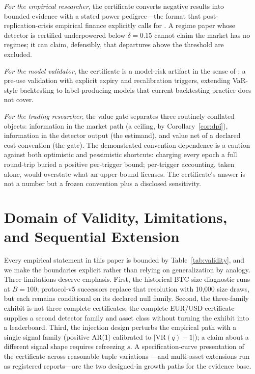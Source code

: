 \documentclass[3p]{elsarticle}
\newcommand{\VR}{\ensuremath{\mathrm{VR}}}
\begin{document}
\noindent\emph{For the empirical researcher}, the certificate converts negative
results into bounded evidence with a stated power pedigree---the format that
post-replication-crisis empirical finance explicitly calls for
\citep{Harvey2017,HouXueZhang2020}. A regime paper whose detector is
certified underpowered below $\delta=0.15$ cannot claim the market has no
regimes; it can claim, defensibly, that departures above the threshold are
excluded.

\par\medskip\noindent\emph{For the model validator}, the certificate is a model-risk artifact
in the sense of \citet{FederalReserveOCC2011}: a pre-use validation with
explicit expiry and recalibration triggers, extending VaR-style backtesting
\citep{Kupiec1995,Christoffersen1998} to label-producing models that current
backtesting practice does not cover.

\par\medskip\noindent\emph{For the trading researcher}, the value gate separates three
routinely conflated objects: information in the market path (a ceiling, by
Corollary~\ref{cor:dpi}), information in the detector output (the estimand),
and value net of a declared cost convention (the gate). The demonstrated
convention-dependence is a caution against both optimistic and pessimistic
shortcuts: charging every epoch a full round-trip buried a positive
per-trigger bound; per-trigger accounting, taken alone, would overstate what
an upper bound licenses. The certificate's answer is not a number but a
frozen convention plus a disclosed sensitivity.

\section{Domain of Validity, Limitations, and Sequential Extension}
\label{sec:validity}

Every empirical statement in this paper is bounded by
Table~\ref{tab:validity}, and we make the boundaries explicit rather than
relying on generalization by analogy. Three limitations deserve emphasis.
First, the historical BTC size diagnostic runs at $B=100$; protocol-v5
successors replace that resolution with 10,000 size draws, but each remains
conditional on its declared null family. Second, the three-family exhibit is
not three complete certificates; the complete EUR/USD certificate supplies a
second detector family and asset class without turning the exhibit into a
leaderboard. Third, the injection design perturbs the
empirical path with a single signal family (positive AR(1) calibrated to
$|\VR(q)-1|$); a claim about a different signal shape requires refreezing
$s$. A specification-curve presentation of the certificate across reasonable
tuple variations \citep{Simonsohn2020}---and multi-asset extensions run as
registered reports---are the two designed-in growth paths for the evidence
base.
\end{document}
